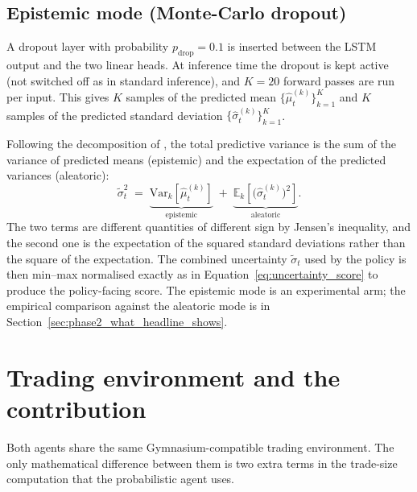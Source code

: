 \subsection{Epistemic mode (Monte-Carlo dropout)}
\label{sec:epistemic_mode}

A dropout layer with probability $p_{\mathrm{drop}} = 0.1$ is inserted between the LSTM output and the two linear heads. At inference time the dropout is kept active (not switched off as in standard inference), and $K = 20$ forward passes are run per input. This gives $K$ samples of the predicted mean $\{ \hat{\mu}_t^{(k)} \}_{k=1}^{K}$ and $K$ samples of the predicted standard deviation $\{ \hat{\sigma}_t^{(k)} \}_{k=1}^{K}$.

Following the decomposition of \textcite{kendall2017uncertainties}, the total predictive variance is the sum of the variance of predicted means (epistemic) and the expectation of the predicted variances (aleatoric):
\begin{equation}
  \label{eq:epistemic_uncertainty}
  \tilde{\sigma}_t^2 \;=\;
    \underbrace{\mathrm{Var}_k\!\left[ \hat{\mu}_t^{(k)} \right]}_{\text{epistemic}}
    \;+\;
    \underbrace{\mathbb{E}_k\!\left[ \bigl(\hat{\sigma}_t^{(k)}\bigr)^2 \right]}_{\text{aleatoric}}.
\end{equation}
The two terms are different quantities of different sign by Jensen's inequality, and the second one is the expectation of the squared standard deviations rather than the square of the expectation. The combined uncertainty $\tilde{\sigma}_t$ used by the policy is then min--max normalised exactly as in Equation~\ref{eq:uncertainty_score} to produce the policy-facing score. The epistemic mode is an experimental arm; the empirical comparison against the aleatoric mode is in Section~\ref{sec:phase2_what_headline_shows}.

\section{Trading environment and the contribution}
\label{sec:env_and_contribution}

Both agents share the same Gymnasium-compatible trading environment. The only mathematical difference between them is two extra terms in the trade-size computation that the probabilistic agent uses.

